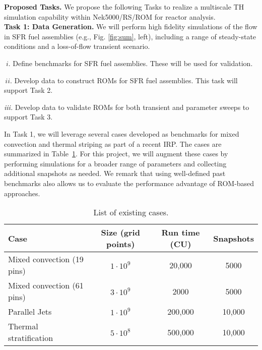 \noindent
\textbf{Proposed Tasks.}
We propose the following Tasks to realize a multiscale TH simulation
capability within Nek5000/RS/ROM for reactor analysis.
\\[-2ex]

\noindent
\textbf{Task 1: Data Generation.} We will perform high fidelity simulations of 
the flow in SFR fuel assemblies (e.g., Fig. \ref{fig:sum}, left), including 
a range of steady-state conditions and a loss-of-flow transient scenario.
\\[-4ex]
\begin{description}
\item{$\; i.$}
Define benchmarks for SFR fuel assemblies. These will be used for validation.
\\[-4ex]
\item{$\, ii.$}
Develop data to construct ROMs for SFR fuel assemblies. This
task will support Task 2.  
\\[-4ex]
\item{\em iii.} Develop data to validate ROMs for both
transient and parameter sweeps to support Task 3.
\\[-3ex]
\end{description}
In Task 1, we will leverage several cases developed as benchmarks for mixed
convection and thermal striping as part of a recent IRP. The cases are
summarized in Table~\ref{tab:cases}. For this project, we will augment these
cases by performing simulations for a broader range of parameters and
collecting additional snapshots as needed. We remark that using well-defined
past benchmarks also allows us to evaluate the performance advantage of
ROM-based approaches. \\[-2ex]

\begin{table}
\centering
\begin{tabular}{|l|c|c|c|}
\hline
\textbf{Case} & \textbf{Size} (grid points) & \textbf{Run time} (CU) & \textbf{Snapshots} \\\hline
Mixed convection (19 pins) \cite{kraus22}& $1\cdot 10^{9}$ & 20,000 & 5000 \\
\hline
Mixed convection (61 pins) \cite{kraus22}& $3\cdot 10^{9}$ & 2000 &  5000 \\
\hline
Parallel Jets \cite{acierno22}& $1\cdot 10^{9}$ & 200,000 & 10,000 \\
\hline
Thermal stratification \cite{krohn2018} & $5\cdot 10^{8}$ & 500,000 & 10,000 \\
\hline
\end{tabular}
\caption{\label{tab:cases} List of existing cases.}
\end{table}

